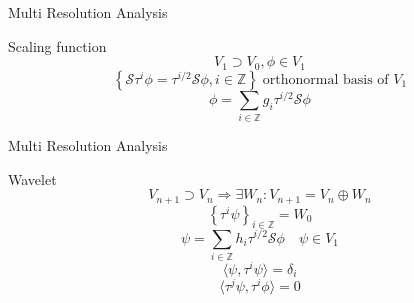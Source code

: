     \begin{frame}{Multi Resolution Analysis}
        \begin{block}{Scaling function}
            \begin{equation}
                V_1 \supset V_0, \phi \in V_1
            \end{equation}
            \begin{equation}
                \left\{\mathcal{S}\tau^i\phi = \tau^{i/2}\mathcal{S}\phi, i \in \mathbb{Z}\right\} \; \text{orthonormal basis of } V_1
            \end{equation}
            \begin{equation}
                    \phi = \sum_{i \in \mathbb{Z}} g_i \tau^{i/2} \mathcal{S} \phi
            \end{equation}
        \end{block}
    \end{frame}

    \begin{frame}{Multi Resolution Analysis}
        \begin{block}{Wavelet}
            \begin{equation}
                V_{n+1} \supset V_n \Rightarrow \exists W_n \colon V_{n+1} = V_n \oplus W_n
            \end{equation}
            \begin{equation}
                \left\{\tau^i\psi\right\}_{i \in \mathbb{Z}} = W_0
            \end{equation}
            \begin{equation}
                \psi = \sum_{i \in \mathbb{Z}} h_i \tau^{i/2}\mathcal{S}\phi\quad\psi \in V_1
            \end{equation}
            \begin{equation}
                \langle \psi, \tau^i \psi \rangle = \delta_i
            \end{equation}
            \begin{equation}
                \langle \tau^j\psi, \tau^i \phi \rangle = 0
            \end{equation}
        \end{block}
    \end{frame}

